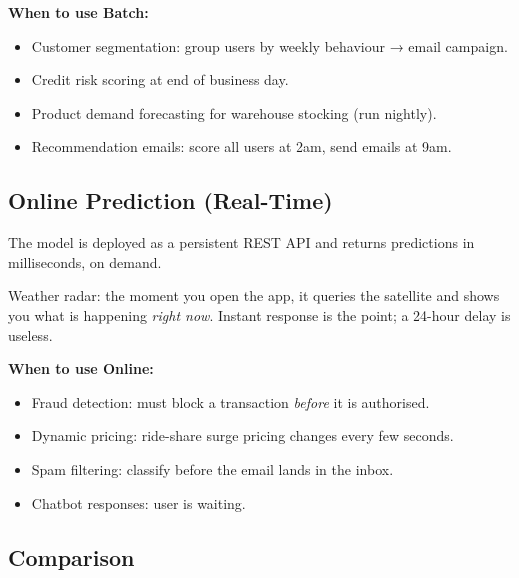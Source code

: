 \documentclass[a4paper,11pt]{article}
\begin{document}
\textbf{When to use Batch:}
\begin{itemize}
  \item Customer segmentation: group users by weekly behaviour → email campaign.
  \item Credit risk scoring at end of business day.
  \item Product demand forecasting for warehouse stocking (run nightly).
  \item Recommendation emails: score all users at 2am, send emails at 9am.
\end{itemize}

\subsection{Online Prediction (Real-Time)}

The model is deployed as a persistent REST API and returns predictions in milliseconds, on demand.

\begin{everyday}
Weather radar: the moment you open the app, it queries the satellite and shows you what is happening \emph{right now}. Instant response is the point; a 24-hour delay is useless.
\end{everyday}

\textbf{When to use Online:}
\begin{itemize}
  \item Fraud detection: must block a transaction \emph{before} it is authorised.
  \item Dynamic pricing: ride-share surge pricing changes every few seconds.
  \item Spam filtering: classify before the email lands in the inbox.
  \item Chatbot responses: user is waiting.
\end{itemize}

\subsection{Comparison}

\begin{center}
\end{center}
\end{document}
